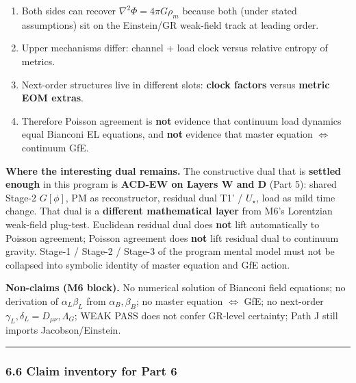 \documentclass[
  11pt,
]{article}
\providecommand{\tightlist}{%
  \setlength{\itemsep}{0pt}\setlength{\parskip}{0pt}}
\begin{document}
\begin{enumerate}
\def\labelenumi{\arabic{enumi}.}
\tightlist
\item
  Both sides can recover \(\nabla^2\Phi=4\pi G\rho_m\) because both (under stated assumptions) sit on the Einstein/GR weak-field track at leading order.
\item
  Upper mechanisms differ: channel + load clock versus relative entropy of metrics.
\item
  Next-order structures live in different slots: \textbf{clock factors} versus \textbf{metric EOM extras}.
\item
  Therefore Poisson agreement is \textbf{not} evidence that continuum load dynamics equal Bianconi EL equations, and \textbf{not} evidence that master equation \(\Leftrightarrow\) continuum GfE.
\end{enumerate}

\textbf{Where the interesting dual remains.} The constructive dual that is \textbf{settled enough} in this program is \textbf{ACD-EW on Layers W and D} (Part 5): shared Stage-2 \(G[\phi]\), PM as reconstructor, residual dual T1' / \(U_\star\), load as mild time change. That dual is a \textbf{different mathematical layer} from M6's Lorentzian weak-field plug-test. Euclidean residual dual does \textbf{not} lift automatically to Poisson agreement; Poisson agreement does \textbf{not} lift residual dual to continuum gravity. Stage-1 / Stage-2 / Stage-3 of the program mental model must not be collapsed into symbolic identity of master equation and GfE action.

\textbf{Non-claims (M6 block).} No numerical solution of Bianconi field equations; no derivation of \(\alpha_L\beta_L\) from \(\alpha_B,\beta_B\); no master equation \(\Leftrightarrow\) GfE; no next-order \(\gamma_L,\delta_L=D_{\mu\nu},\Lambda_G\); WEAK PASS does not confer GR-level certainty; Path J still imports Jacobson/Einstein.

\begin{center}\rule{0.5\linewidth}{0.5pt}\end{center}

\subsubsection{6.6 Claim inventory for Part 6}\label{claim-inventory-for-part-6}
\end{document}
